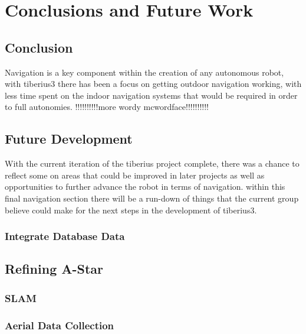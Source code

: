 \section{Conclusions and Future Work}

\subsection{Conclusion}
Navigation is a key component within the creation of any autonomous robot, with \gls{tiberius3} there has been a focus on getting outdoor navigation working, with less time spent on the indoor navigation systems that would be required in order to full autonomies.
\newline
!!!!!!!!!!more wordy mcwordface!!!!!!!!!!
\subsection{Future Development}
With the current iteration of the tiberius project complete, there was a chance to reflect some on areas that could be improved in later projects as well as opportunities to further advance the robot in terms of navigation. within this final navigation section there will be a run-down of things that the current group believe could make for the next steps in the development of \gls{tiberius3}. 
\subsubsection{Integrate Database Data}

\subsection{Refining A-Star}

\subsubsection{SLAM}

\subsubsection{Aerial Data Collection}